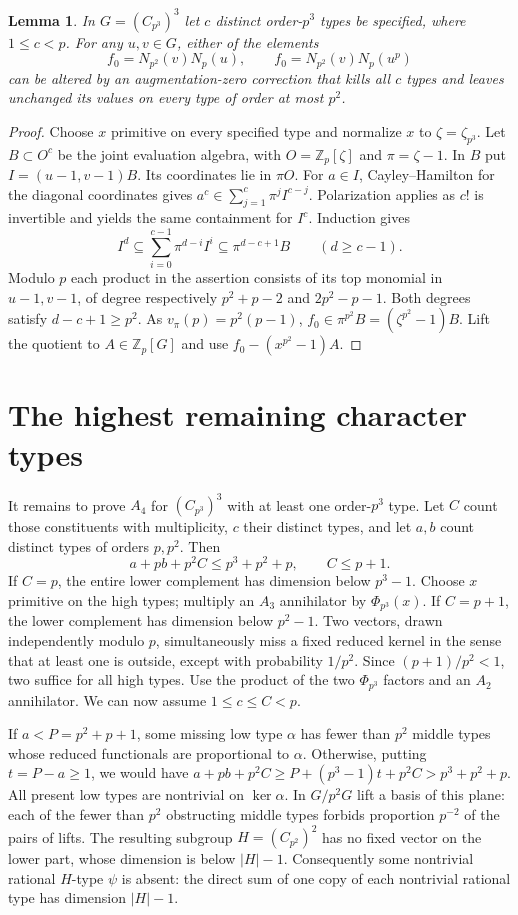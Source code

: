 \documentclass[11pt]{article}
\newtheorem{lemma}[theorem]{Lemma}
\newcommand{\Z}{\mathbb Z}
\newcommand{\Ph}[1]{\Phi_{p^{#1}}}
\begin{document}
\begin{lemma}\label{lem:high}
In $G=(C_{p^3})^3$ let $c$ distinct order-$p^3$ types be specified,
where $1\le c<p$. For any $u,v\in G$, either of the elements
\[
 f_0=N_{p^2}(v)N_p(u),\qquad f_0=N_{p^2}(v)N_p(u^p)
\]
can be altered by an augmentation-zero correction that kills all $c$
types and leaves unchanged its values on every type of order at most $p^2$.
\end{lemma}
\begin{proof}
Choose $x$ primitive on every specified type and normalize $x$ to
$\zeta=\zeta_{p^3}$. Let $B\subset O^c$ be the joint evaluation
algebra, with $O=\Z_p[\zeta]$ and $\pi=\zeta-1$. In $B$ put
$I=(u-1,v-1)B$. Its coordinates lie in $\pi O$. For $a\in I$,
Cayley--Hamilton for the diagonal coordinates gives
$a^c\in\sum_{j=1}^c\pi^j I^{c-j}$. Polarization applies as $c!$ is
invertible and yields the same containment for $I^c$. Induction gives
\[
 I^d\subseteq\sum_{i=0}^{c-1}\pi^{d-i}I^i
 \subseteq\pi^{d-c+1} B\qquad(d\ge c-1).
\]
Modulo $p$ each product in the assertion consists of its top monomial
in $u-1,v-1$, of degree respectively $p^2+p-2$ and $2p^2-p-1$.
Both degrees satisfy $d-c+1\ge p^2$. As $v_\pi(p)=p^2(p-1)$,
$f_0\in\pi^{p^2}B=(\zeta^{p^2}-1)B$. Lift the quotient to
$A\in\Z_p[G]$ and use $f_0-(x^{p^2}-1)A$.
\end{proof}

\section{The highest remaining character types}
It remains to prove $A_4$ for $(C_{p^3})^3$ with at least one
order-$p^3$ type. Let $C$ count those constituents with multiplicity,
$c$ their distinct types, and let $a,b$ count distinct types of orders
$p,p^2$. Then
\[
 a+pb+p^2C\le p^3+p^2+p,\qquad C\le p+1.
\]
If $C=p$, the entire lower complement has dimension below $p^3-1$.
Choose $x$ primitive on the high types; multiply an $A_3$ annihilator
by $\Ph{3}(x)$. If $C=p+1$, the lower complement has dimension below
$p^2-1$. Two vectors, drawn independently modulo $p$, simultaneously
miss a fixed reduced kernel in the sense that at least one is outside,
except with probability $1/p^2$. Since $(p+1)/p^2<1$, two suffice for
all high types. Use the product of the two $\Ph{3}$ factors and an
$A_2$ annihilator. We can now assume $1\le c\le C<p$.

If $a<P=p^2+p+1$, some missing low type $\alpha$ has fewer than $p^2$
middle types whose reduced functionals are proportional to $\alpha$.
Otherwise, putting $t=P-a\ge1$, we would have
$a+pb+p^2C\ge P+(p^3-1)t+p^2C>p^3+p^2+p$.
All present low types are nontrivial on $\ker\alpha$.
In $G/p^2G$ lift a basis of this plane: each of the fewer than $p^2$
obstructing middle types forbids proportion $p^{-2}$ of the pairs of
lifts. The resulting subgroup $H=(C_{p^2})^2$ has no fixed vector on
the lower part, whose dimension is below $|H|-1$. Consequently some
nontrivial rational $H$-type $\psi$ is absent: the direct sum of one
copy of each nontrivial rational type has dimension $|H|-1$.
\end{document}
